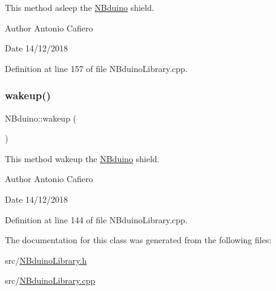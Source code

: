 This method asleep the \mbox{\hyperlink{class_n_bduino}{N\+Bduino}} shield. \begin{DoxyAuthor}{Author}
Antonio Cafiero 
\end{DoxyAuthor}
\begin{DoxyDate}{Date}
14/12/2018 
\end{DoxyDate}


Definition at line 157 of file N\+Bduino\+Library.\+cpp.

\mbox{\label{class_n_bduino_a8e740e7b90e6e75b7dd3b7900ee0dd22}} 
\subsubsection{\texorpdfstring{wakeup()}{wakeup()}}
{\footnotesize\ttfamily N\+Bduino\+::wakeup (\begin{DoxyParamCaption}{ }\end{DoxyParamCaption})}

This method wakeup the \mbox{\hyperlink{class_n_bduino}{N\+Bduino}} shield. \begin{DoxyAuthor}{Author}
Antonio Cafiero 
\end{DoxyAuthor}
\begin{DoxyDate}{Date}
14/12/2018 
\end{DoxyDate}


Definition at line 144 of file N\+Bduino\+Library.\+cpp.



The documentation for this class was generated from the following files\+:\begin{DoxyCompactItemize}
\item 
src/\mbox{\hyperlink{_n_bduino_library_8h}{N\+Bduino\+Library.\+h}}\item 
src/\mbox{\hyperlink{_n_bduino_library_8cpp}{N\+Bduino\+Library.\+cpp}}\end{DoxyCompactItemize}

